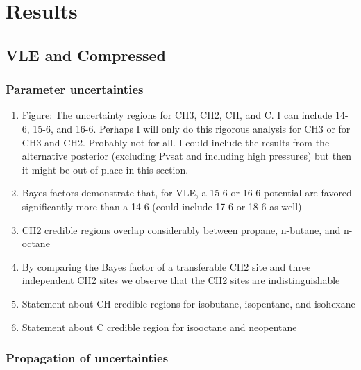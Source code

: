 \documentclass[preprint,letterpaper,floatfix,citeautoscript,aip,jcp]{revtex4-1}
\begin{document}
\section{Results}

\subsection{VLE and Compressed}

\subsubsection{Parameter uncertainties}

\begin{enumerate}
	\item Figure: The uncertainty regions for CH3, CH2, CH, and C. I can include 14-6, 15-6, and 16-6. Perhaps I will only do this rigorous analysis for CH3 or for CH3 and CH2. Probably not for all. I could include the results from the alternative posterior (excluding Pvsat and including high pressures) but then it might be out of place in this section.
	\item Bayes factors demonstrate that, for VLE, a 15-6 or 16-6 potential are favored significantly more than a 14-6 (could include 17-6 or 18-6 as well)
	\item CH2 credible regions overlap considerably between propane, n-butane, and n-octane
	\item By comparing the Bayes factor of a transferable CH2 site and three independent CH2 sites we observe that the CH2 sites are indistinguishable
	\item Statement about CH credible regions for isobutane, isopentane, and isohexane
	\item Statement about C credible region for isooctane and neopentane
\end{enumerate}

\subsubsection{Propagation of uncertainties}
\end{document}
